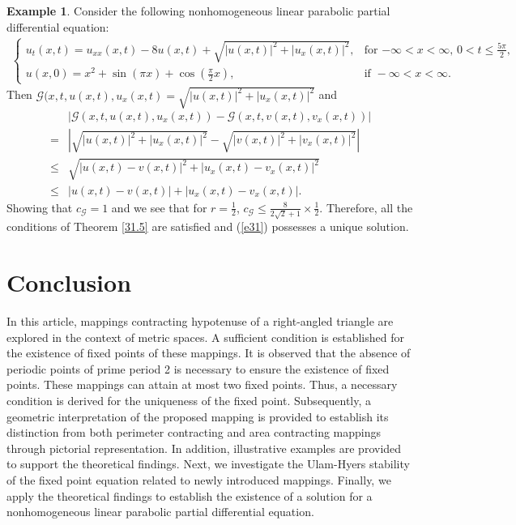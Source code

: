 \documentclass[11pt,reqno,a4paper]{amsart}
\theoremstyle{plain}
\theoremstyle{definition}
\newtheorem{example}[theorem]{Example}
\theoremstyle{remark}
\numberwithin{equation}{section}
\begin{document}
\begin{example}\label{38}
Consider the following nonhomogeneous linear parabolic partial differential equation:
\begin{align}\label{e31}
\begin{cases}
u_t(x,t)=u_{xx}(x,t)-8 u(x,t)+\sqrt{|u(x,t)|^2+|u_x(x,t)|^2}, & \text{for } \text{$-\infty<x<\infty$, $0<t\le \frac{5\pi}{2}$},  \\
u(x,0)=x^2+\sin(\pi x)+\cos\left(\frac{\pi}{2}x\right), & \text{if } -\infty<x<\infty.
\end{cases}
\end{align}
Then $\mathcal{G}(x,t,u(x,t),u_x(x,t)=\sqrt{|u(x,t)|^2+|u_x(x,t)|^2}$ and
\begin{align*}
&|\mathcal{G}(x,t,u(x,t),u_x(x,t))-\mathcal{G}(x,t,v(x,t),v_x(x,t))|\\
=&|\sqrt{|u(x,t)|^2+|u_x(x,t)|^2}-\sqrt{|v(x,t)|^2+|v_x(x,t)|^2}|\\
\le & \sqrt{|u(x,t)-v(x,t)|^2+|u_x(x,t)-v_x(x,t)|^2}\\
\le & |u(x,t)-v(x,t)|+|u_x(x,t)-v_x(x,t)|.
\end{align*}
Showing that $c_\mathcal{G}=1$ and we see that for $r=\frac{1}{2}$, $c_\mathcal{G}\le \frac{8}{2\sqrt{2}+1}\times\frac{1}{2}$. Therefore, all the conditions of Theorem \ref{31.5} are satisfied and (\ref{e31}) possesses a unique solution.
\end{example}


\section{Conclusion}
In this article, mappings contracting hypotenuse of a right-angled triangle are explored in the context of metric spaces. A sufficient condition is established for the existence of fixed points of these mappings. It is observed that the absence of periodic points of prime period 2 is necessary to ensure the existence of fixed points. These mappings can attain at most two fixed points. Thus, a necessary condition is derived for the uniqueness of the fixed point. Subsequently, a geometric interpretation of the proposed mapping is provided to establish its distinction from both perimeter contracting and area contracting mappings through pictorial representation. In addition, illustrative examples are provided to support the theoretical findings. Next, we investigate the Ulam-Hyers stability of the fixed point equation related to newly introduced mappings. Finally, we apply the theoretical findings to establish the existence of a solution for a nonhomogeneous linear parabolic partial differential equation. 
\end{document}
